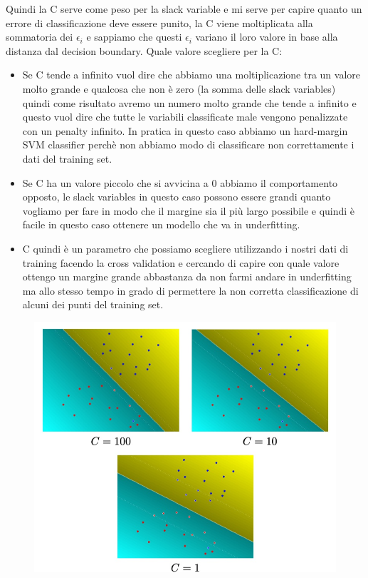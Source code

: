 \documentclass[14pt]{extreport}
\begin{document}
Quindi la C serve come peso per la slack variable e mi serve per capire quanto un errore di classificazione deve essere punito, la C viene
moltiplicata alla sommatoria dei $\epsilon_i$ e sappiamo che questi $\epsilon_i$ variano il loro valore in base alla distanza dal decision boundary.
Quale valore scegliere per la C:
\begin{itemize}
\item Se C tende a infinito vuol dire che abbiamo una moltiplicazione tra un valore molto grande e qualcosa che non è zero (la somma delle slack
variables) quindi come risultato avremo un numero molto grande che tende a infinito e questo vuol dire che tutte le variabili classificate male
vengono penalizzate con un penalty infinito. In pratica in questo caso abbiamo un hard-margin SVM classifier perchè non abbiamo modo di classificare
non correttamente i dati del training set.
\item Se C ha un valore piccolo che si avvicina a 0 abbiamo il comportamento opposto, le slack variables in questo caso possono essere grandi quanto
vogliamo per fare in modo che il margine sia il più largo possibile e quindi è facile in questo caso ottenere un modello che va in underfitting.
\item C quindi è un parametro che possiamo scegliere utilizzando i nostri dati di training facendo la cross validation e cercando di capire con quale
valore ottengo un margine grande abbastanza da non farmi andare in underfitting ma allo stesso tempo in grado di permettere la non corretta
classificazione di alcuni dei punti del training set.
\end{itemize}

\begin{figure}[H]
\centering
\includegraphics[width=0.7\linewidth]{326.jpeg}
\end{figure}
\end{document}
